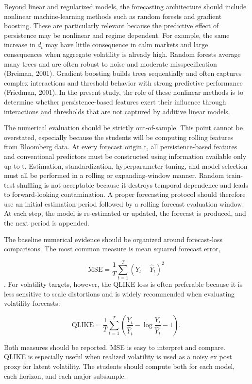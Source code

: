 \documentclass[12pt]{article}
\begin{document}
Beyond linear and regularized models, the forecasting architecture should include nonlinear machine-learning methods such as random forests and gradient boosting. These are particularly relevant because the predictive effect of persistence may be nonlinear and regime dependent. For example, the same increase in $d_t$ may have little consequence in calm markets and large consequences when aggregate volatility is already high. Random forests average many trees and are often robust to noise and moderate misspecification (Breiman, 2001). Gradient boosting builds trees sequentially and often captures complex interactions and threshold behavior with strong predictive performance (Friedman, 2001). In the present study, the role of these nonlinear methods is to determine whether persistence-based features exert their influence through interactions and thresholds that are not captured by additive linear models.

The numerical evaluation should be strictly out-of-sample. This point cannot be overstated, especially because the students will be computing rolling features from Bloomberg data. At every forecast origin t, all persistence-based features and conventional predictors must be constructed using information available only up to t. Estimation, standardization, hyperparameter tuning, and model selection must all be performed in a rolling or expanding-window manner. Random train-test shuffling is not acceptable because it destroys temporal dependence and leads to forward-looking contamination. A proper forecasting protocol should therefore use an initial estimation period followed by a rolling forecast evaluation window. At each step, the model is re-estimated or updated, the forecast is produced, and the next period is appended.

The baseline numerical evidence should be organized around forecast-loss comparisons. The most common measure is mean squared forecast error,

\[\mathrm{MSE} = \frac{1}{T}\sum_{t=1}^{T}(Y_t - \hat{Y}_t)^2\]
.
For volatility targets, however, the QLIKE loss is often preferable because it is less sensitive to scale distortions and is widely recommended when evaluating volatility forecasts:

\[\mathrm{QLIKE} = \frac{1}{T}\sum_{t=1}^{T}\left(\frac{Y_t}{\hat{Y}_t} - \log\frac{Y_t}{\hat{Y}_t} - 1\right).\]

Both measures should be reported. MSE is easy to interpret and compare. QLIKE is especially useful when realized volatility is used as a noisy ex post proxy for latent volatility. The students should compute both for each model, each horizon, and each major subsample.
\end{document}

